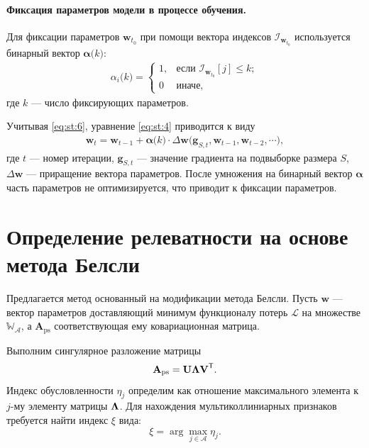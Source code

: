 \paragraph{Фиксация параметров модели в процессе обучения.}
Для фиксации параметров $\textbf{w}_{t_0}$ при помощи вектора индексов $\mathcal{I}_{\textbf{w}_{t_0}}$ используется бинарный вектор $\bm{\alpha}\bigr(k\bigr)$:
\[
\label{eq:st:6}
\begin{aligned}
\alpha_i\bigr(k\bigr) = \begin{cases}
   1, &\text{если }\mathcal{I}_{\textbf{w}_{t_0}}[j] \leq k;\\
   0 &\text{иначе},
 \end{cases}
\end{aligned}
\]
 где $k$ --- число фиксирующих параметров.
 
 Учитывая \eqref{eq:st:6}, уравнение \eqref{eq:st:4} приводится к виду
 \[
\label{eq:st:7}
\begin{aligned}
\textbf{w}_{t} = \textbf{w}_{t-1} + \bm{\alpha}\bigr(k\bigr)\cdot\Delta\textbf{w}\bigr(\textbf{g}_{S,t}, \textbf{w}_{t-1}, \textbf{w}_{t-2}, \cdots\bigr),
\end{aligned}
\]
где $t$ --- номер итерации, $\textbf{g}_{S,t}$ --- значение градиента на подвыборке размера $S$, $\Delta\textbf{w}$ --- приращение вектора параметров. После умножения на бинарный вектор $\bm\alpha$ часть параметров не оптимизируется, что приводит к фиксации параметров.

\section{Определение релеватности на основе метода Белсли}
Предлагается метод основанный на модификации метода Белсли. Пусть $\textbf{w}$ --- вектор параметров доставляющий минимум функционалу потерь $\mathcal{L}$ на  множестве $\mathbb{W_\mathcal{A}}$, а $\textbf{A}_\text{ps}$ соответствующая ему ковариационная матрица.

Выполним сингулярное разложение матрицы
\[
\label{4.1}
\textbf{A}_\text{ps} = \textbf{U}{\bf\Lambda}\textbf{V}^\mathsf{T}.
\]
Индекс обусловленности $\eta_{j}$ определим как отношение максимального элемента к $j$-му элементу матрицы ${\bf\Lambda}$. Для нахождения мультиколлиниарных признаков требуется найти индекс $\xi$ вида:
\[
\label{4.2}
\xi = \arg\max_{j\in \mathcal{A}}{\eta_j}.
\]

